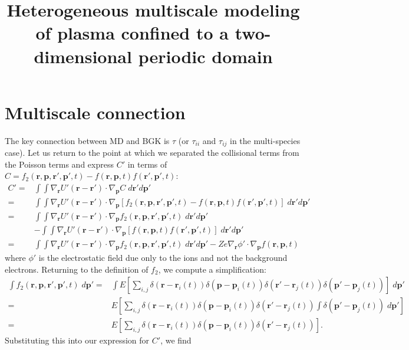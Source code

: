 \documentclass{article}
\title{Heterogeneous multiscale modeling of plasma confined to a two-dimensional periodic domain}
\begin{document}
\maketitle

\section{Multiscale connection}

The key connection between MD and BGK is $\tau$ (or $\tau_{ii}$ and $\tau_{ij}$ in the multi-species case). Let us return to the point at which we separated the collisional terms from the Poisson terms and express $C'$ in terms of $C=f_2(\mathbf{r},\mathbf{p},\mathbf{r}',\mathbf{p}',t)-f(\mathbf{r},\mathbf{p},t)f(\mathbf{r}',\mathbf{p}',t)$:
\begin{align*}
C'=&\int\int\nabla_\mathbf{r}U'(\mathbf{r}-\mathbf{r'})\cdot\nabla_\mathbf{p}C\;d\mathbf{r}'d\mathbf{p}'\\
=&\int\int\nabla_\mathbf{r}U'(\mathbf{r}-\mathbf{r'})\cdot\nabla_\mathbf{p}[f_2(\mathbf{r},\mathbf{p},\mathbf{r}',\mathbf{p}',t)-f(\mathbf{r},\mathbf{p},t)f(\mathbf{r}',\mathbf{p}',t)]\;d\mathbf{r}'d\mathbf{p}'\\
=&\int\int\nabla_\mathbf{r}U'(\mathbf{r}-\mathbf{r}')\cdot\nabla_\mathbf{p}f_2(\mathbf{r},\mathbf{p},\mathbf{r}',\mathbf{p}',t)\;d\mathbf{r}'d\mathbf{p}'\\&-\int\int\nabla_\mathbf{r}U'(\mathbf{r}-\mathbf{r}')\cdot\nabla_\mathbf{p}[f(\mathbf{r},\mathbf{p},t)f(\mathbf{r}',\mathbf{p}',t)]\;d\mathbf{r}'d\mathbf{p}'\\
=&\int\int\nabla_\mathbf{r}U'(\mathbf{r}-\mathbf{r}')\cdot\nabla_\mathbf{p}f_2(\mathbf{r},\mathbf{p},\mathbf{r}',\mathbf{p}',t)\;d\mathbf{r}'d\mathbf{p}'-Ze\nabla_\mathbf{r}\phi'\cdot \nabla_\mathbf{p}f(\mathbf{r},\mathbf{p},t)
\end{align*}where $\phi'$ is the electrostatic field due only to the ions and not the background electrons. Returning to the definition of $f_2$, we compute a simplification:
\begin{align*}
\int f_2(\mathbf{r},\mathbf{p},\mathbf{r}',\mathbf{p}',t)\;d\mathbf{p}'=&\int E\left[\sum_{i,j}\delta(\mathbf{r}-\mathbf{r}_i(t))\delta(\mathbf{p}-\mathbf{p}_i(t))\delta(\mathbf{r}'-\mathbf{r}_j(t))\delta(\mathbf{p}'-\mathbf{p}_j(t))\right]\;d\mathbf{p}'\\
=&E\left[\sum_{i,j}\delta(\mathbf{r}-\mathbf{r}_i(t))\delta(\mathbf{p}-\mathbf{p}_i(t))\delta(\mathbf{r}'-\mathbf{r}_j(t))\int \delta(\mathbf{p}'-\mathbf{p}_j(t))\;d\mathbf{p}'\right]\\
=&E\left[\sum_{i,j}\delta(\mathbf{r}-\mathbf{r}_i(t))\delta(\mathbf{p}-\mathbf{p}_i(t))\delta(\mathbf{r}'-\mathbf{r}_j(t))\right].
\end{align*}Substituting this into our expression for $C'$, we find
\end{document}
